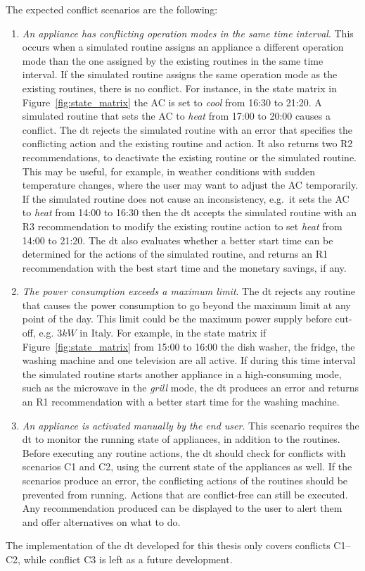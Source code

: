 The expected conflict scenarios are the following:
\begin{enumerate}[label={C\arabic*.}, leftmargin=3.5em]
    \item \textit{An appliance has conflicting operation modes in the same time interval}. This occurs when a simulated routine assigns an appliance a different operation mode than the one assigned by the existing routines in the same time interval. If the simulated routine assigns the same operation mode as the existing routines, there is no conflict. For instance, in the state matrix in Figure~\ref{fig:state_matrix} the AC is set to \textit{cool} from 16:30 to 21:20. A simulated routine that sets the AC to \textit{heat} from 17:00 to 20:00 causes a conflict. The \acrshort{dt} rejects the simulated routine with an error that specifies the conflicting action and the existing routine and action. It also returns two R2 recommendations, to  deactivate the existing routine or the simulated routine. This may be useful, for example, in weather conditions with sudden temperature changes, where the user may want to adjust the AC temporarily. If the simulated routine does not cause an inconsistency, e.g.\ it sets the AC to \textit{heat} from 14:00 to 16:30 then the \acrshort{dt} accepts the simulated routine with an R3 recommendation to modify the existing routine action to set \textit{heat} from 14:00 to 21:20. The \acrshort{dt} also evaluates whether a better start time can be determined for the actions of the simulated routine, and returns an R1 recommendation with the best start time and the monetary savings, if any.

    \item \textit{The power consumption exceeds a maximum limit}. The \acrshort{dt} rejects any routine that causes the power consumption to go beyond the maximum limit at any point of the day. This limit could be the maximum power supply before cut-off, e.g. \(3kW\) in Italy. For example, in the state matrix if Figure~\ref{fig:state_matrix} from 15:00 to 16:00 the dish washer, the fridge, the washing machine and one television are all active. If during this time interval the simulated routine starts another appliance in a high-consuming mode, such as the microwave in the \textit{grill} mode, the \acrshort{dt} produces an error and returns an R1 recommendation with a better start time for the washing machine.

    \item \textit{An appliance is activated manually by the end user}. This scenario requires the \acrshort{dt} to monitor the running state of appliances, in addition to the routines. Before executing any routine actions, the \acrshort{dt} should check for conflicts with scenarios C1 and C2, using the current state of the appliances as well. If the scenarios produce an error, the conflicting actions of the routines should be prevented from running. Actions that are conflict-free can still be executed. Any recommendation produced can be displayed to the user to alert them and offer alternatives on what to do.
\end{enumerate}
The implementation of the \acrshort{dt} developed for this thesis only covers conflicts C1--C2, while conflict C3 is left as a future development.

